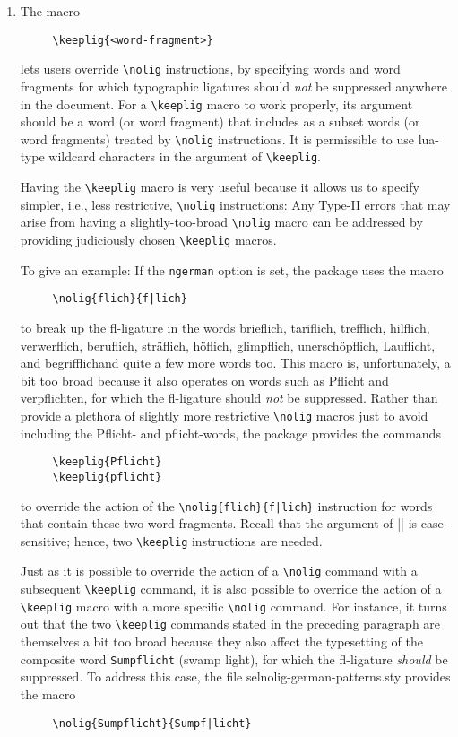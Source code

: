 \documentclass[12pt]{article}
\newcommand{\pkg}[1]{\textsf{#1}}
\newcommand{\opt}[1]{\texttt{#1}}
\newcommand{\cmmd}[1]{\texttt{\textbackslash #1}}
\begin{document}
\begin{enumerate}
The arguments of the \cmmd{nolig} command, as well as of the package's other user commands, are case-sensitive. 

\item The macro 
\begin{Verbatim}
     \keeplig{<word-fragment>}
\end{Verbatim}
lets users override \cmmd{nolig} instructions, by specifying words and word fragments for which typographic ligatures should \emph{not} be suppressed anywhere in the document. For a \cmmd{keeplig} macro to work properly, its argument should be a word (or word fragment) that includes as a subset words (or word fragments) treated by \cmmd{nolig} instructions. It is permissible to use lua-type wildcard characters in the argument of \cmmd{keeplig}. 

Having the \cmmd{keeplig} macro is very useful because it allows us to specify simpler, i.e., less restrictive, \cmmd{nolig} instructions: Any Type-II errors that may arise from having a slightly-too-broad \cmmd{nolig} macro can be addressed by providing judiciously chosen \cmmd{keeplig} macros.

\enlargethispage{1\baselineskip}

To give an example: If the \opt{ngerman} option is set, the package uses the macro 
\begin{Verbatim}
     \nolig{flich}{f|lich}
\end{Verbatim}
to break up the fl-ligature in the words brieflich, tariflich, trefflich, hilflich, verwerflich, beruflich, sträflich, höflich, glimpflich, unerschöpflich, Lauflicht, and begrifflich\textemdash and quite a few more words too. This macro is, unfortunately, a bit too broad because it also operates on words such as Pf\breaklig licht and verpf\breaklig lichten, for which the fl-ligature should \emph{not} be suppressed. Rather than provide a plethora of slightly more restrictive \cmmd{nolig} macros just to avoid including the Pflicht- and pflicht-words, the package provides the commands
\begin{Verbatim}
     \keeplig{Pflicht}
     \keeplig{pflicht}
\end{Verbatim}
to override the action of the \Verb+\nolig{flich}{f|lich}+ instruction for words that contain these two word fragments. Recall that the argument of |\keeplig| is case-sensitive; hence, two \cmmd{keeplig} instructions are needed.

Just as it is possible to override the action of a \cmmd{nolig} command with a subsequent \cmmd{keeplig} command, it is also possible to override the action of a \cmmd{keeplig} macro with a more specific \cmmd{nolig} command. For instance, it turns out that the two \cmmd{keeplig} commands stated in the preceding paragraph are themselves a bit too broad because they also affect the typesetting of the composite word \opt{Sumpflicht} (swamp light), for which the fl-ligature \emph{should} be suppressed. To address this case, the file \pkg{selnolig-german-patterns.sty} provides the macro 
\begin{Verbatim}
     \nolig{Sumpflicht}{Sumpf|licht}
\end{Verbatim}


\end{enumerate}
\end{document}
